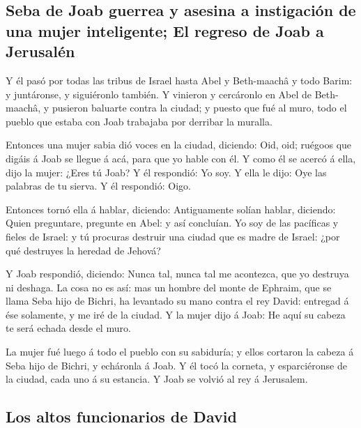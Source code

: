 \hypertarget{seba-de-joab-guerrea-y-asesina-a-instigaciuxf3n-de-una-mujer-inteligente-el-regreso-de-joab-a-jerusaluxe9n}{%
\subsection{Seba de Joab guerrea y asesina a instigación de una mujer
inteligente; El regreso de Joab a
Jerusalén}\label{seba-de-joab-guerrea-y-asesina-a-instigaciuxf3n-de-una-mujer-inteligente-el-regreso-de-joab-a-jerusaluxe9n}}

 Y él pasó por todas las tribus de Israel hasta Abel y
Beth-maachâ y todo Barim: y juntáronse, y siguiéronlo también.
 Y vinieron y cercáronlo en Abel de Beth-maachâ, y pusieron
baluarte contra la ciudad; y puesto que fué al muro, todo el pueblo que
estaba con Joab trabajaba por derribar la muralla.

 Entonces una mujer sabia dió voces en la ciudad, diciendo:
Oid, oid; ruégoos que digáis á Joab se llegue á acá, para que yo hable
con él.  Y como él se acercó á ella, dijo la mujer: ¿Eres
tú Joab? Y él respondió: Yo soy. Y ella le dijo: Oye las palabras de tu
sierva. Y él respondió: Oigo.

 Entonces tornó ella á hablar, diciendo: Antiguamente
solían hablar, diciendo: Quien preguntare, pregunte en Abel: y así
concluían.  Yo soy de las pacíficas y fieles de Israel: y
tú procuras destruir una ciudad que es madre de Israel: ¿por qué
destruyes la heredad de Jehová?

 Y Joab respondió, diciendo: Nunca tal, nunca tal me
acontezca, que yo destruya ni deshaga.  La cosa no es así:
mas un hombre del monte de Ephraim, que se llama Seba hijo de Bichri, ha
levantado su mano contra el rey David: entregad á ése solamente, y me
iré de la ciudad. Y la mujer dijo á Joab: He aquí su cabeza te será
echada desde el muro.

 La mujer fué luego á todo el pueblo con su sabiduría; y
ellos cortaron la cabeza á Seba hijo de Bichri, y echáronla á Joab. Y él
tocó la corneta, y esparciéronse de la ciudad, cada uno á su estancia. Y
Joab se volvió al rey á Jerusalem.

\hypertarget{los-altos-funcionarios-de-david}{%
\subsection{Los altos funcionarios de
David}\label{los-altos-funcionarios-de-david}}

